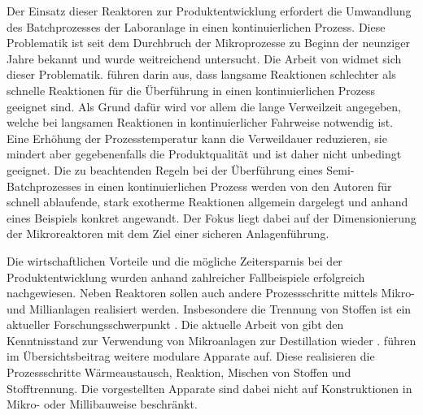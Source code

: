Der Einsatz dieser Reaktoren zur Produktentwicklung erfordert die Umwandlung des Batchprozesses der Laboranlage in einen kontinuierlichen Prozess. Diese Problematik ist seit dem Durchbruch der Mikroprozesse zu Beginn der neunziger Jahre bekannt und wurde weitreichend untersucht. \cite{Helling_2012} Die Arbeit  von \citeauthor{Hugo_2009} widmet sich dieser Problematik. \citeauthor{Hugo_2009} f\"uhren darin aus, dass langsame Reaktionen schlechter als schnelle Reaktionen f\"ur die \"Uberf\"uhrung in einen kontinuierlichen Prozess geeignet sind. Als Grund daf\"ur wird vor allem die lange Verweilzeit angegeben, welche bei langsamen Reaktionen in kontinuierlicher Fahrweise notwendig ist. Eine Erh\"ohung der Prozesstemperatur kann die Verweildauer reduzieren, sie mindert aber gegebenenfalls die Produktqualit\"at und ist daher nicht unbedingt geeignet. Die zu beachtenden Regeln bei der \"Uberf\"uhrung eines Semi-Batchprozesses in einen kontinuierlichen Prozess werden von den Autoren f\"ur  schnell ablaufende, stark exotherme Reaktionen allgemein dargelegt und anhand eines Beispiels konkret angewandt. Der Fokus liegt dabei auf der Dimensionierung der Mikroreaktoren mit dem Ziel einer sicheren Anlagenf\"uhrung.\cite{Hugo_2009}

Die wirtschaftlichen Vorteile und die m\"ogliche Zeitersparnis bei der Produktentwicklung wurden anhand zahlreicher Fallbeispiele erfolgreich nachgewiesen. \cite{Brodhagen_2012, Behr_2012, Grundemann_2012, Sell_2013} Neben Reaktoren sollen auch andere Prozessschritte mittels Mikro- und Millianlagen realisiert werden. Insbesondere die Trennung von Stoffen ist ein aktueller Forschungsschwerpunkt \cite{Helling_2012}. Die aktuelle Arbeit von \citeauthor{Yang_2017} gibt den Kenntnisstand zur Verwendung von Mikroanlagen zur Destillation wieder \cite{Yang_2017}. \citeauthor{Lier_2016} f\"uhren im \"Ubersichtsbeitrag weitere modulare Apparate auf. Diese realisieren die Prozessschritte W\"armeaustausch, Reaktion, Mischen von Stoffen und Stofftrennung. Die vorgestellten Apparate  sind dabei nicht auf Konstruktionen in Mikro- oder Millibauweise beschr\"ankt. \cite{Lier_2016}

